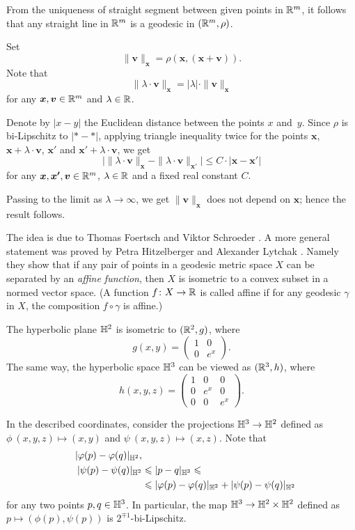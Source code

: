 From the uniqueness of straight segment between given points in $\mathbb{R}^m$,
it follows that any straight line in $\mathbb{R}^m$ is a geodesic in $(\mathbb{R}^m,\rho)$.

Set 
\[\|\bm{v}\|_{\bm{x}}=\rho(\bm{x},(\bm{x}+\bm{v})).\]
Note that 
\[ \|\lambda\cdot\bm{v}\|_{\bm{x}}
=
|\lambda|\cdot\|\bm{v}\|_{\bm{x}}\]
for any $\bm{x},\bm{v}\in\mathbb{R}^m$ and $\lambda\in\mathbb{R}$.

Denote by $|x-y|$ the Euclidean distance between the points $x$ and~$y$.
Since $\rho$ is bi-Lipschitz to $|{*}-{*}|$,
applying triangle inequality twice for the points $\bm{x}$, $\bm{x}+\lambda\cdot\bm{v}$, $\bm{x}'$ and $\bm{x}'+\lambda\cdot\bm{v}$, we get
\[
\bigl|\|\lambda\cdot\bm{v}\|_{\bm{x}}
-
\|\lambda\cdot\bm{v}\|_{\bm{x}'}\bigr|
\le 
C\cdot |\bm{x}-\bm{x'}|\]
for any $\bm{x},\bm{x'},\bm{v}\in\mathbb{R}^m$, 
$\lambda\in\mathbb{R}$
and a fixed real constant $C$.

Passing to the limit as $\lambda\to\infty$, 
we get
$\|\bm{v}\|_{\bm{x}}$ does not depend on $\bm{x}$;
hence the result follows.\qeds


The idea is due to Thomas Foertsch
and Viktor Schroeder \cite[see][]{foertsch-schroeder}.
A more general statement was proved by Petra Hitzelberger and Alexander Lytchak \cite[see][]{hitzelberger-lytchak}.
Namely they show that 
if any pair of points in a geodesic metric space $X$ can be separated by an \emph{affine function},
then $X$ is isometric to a convex subset in a normed vector space.
(A function $f\colon X\to\mathbb{R}$ is called affine if for any geodesic $\gamma$ in $X$, the composition $f\circ\gamma$ is affine.)


The hyperbolic plane $\mathbb{H}^2$ is isometric to $(\mathbb{R}^2,g)$, where 
\[g(x,y)=\left(\begin{matrix}
     1&0
     \\
     0&e^{x}
    \end{matrix}\right).\]
The same way, the hyperbolic space $\mathbb{H}^3$
can be viewed as $(\mathbb{R}^3,h)$, where 
\[h(x,y,z)=\left(\begin{matrix}
     1&0&0
     \\
     0&e^{x}&0
     \\
     0&0&e^{x}
\end{matrix}\right).\]
    
In the described coordinates, consider the projections $\mathbb{H}^3\to\mathbb{H}^2$ defined as 
$\phi\:(x,y,z)\mapsto (x,y)$ and $\psi\:(x,y,z)\mapsto (x,z)$.
Note that 
\begin{align*}
|\varphi(p)-\varphi(q)|_{\mathbb{H}^2},&
\\
\quad |\psi(p)-\psi(q)|_{\mathbb{H}^2}
&\leqslant
|p-q|_{\mathbb{H}^3}
\leqslant
\\
&\leqslant
|\varphi(p)-\varphi(q)|_{\mathbb{H}^2}+ |\psi(p)-\psi(q)|_{\mathbb{H}^2}
\end{align*}
for any two points $p,q\in \mathbb{H}^3$.
In particular, the map $\mathbb{H}^3\to\mathbb{H}^2\times\mathbb{H}^2$ defined as $p\mapsto (\phi(p),\psi(p))$
is $2^{\mp1}$-bi-Lipschitz.\qeds

